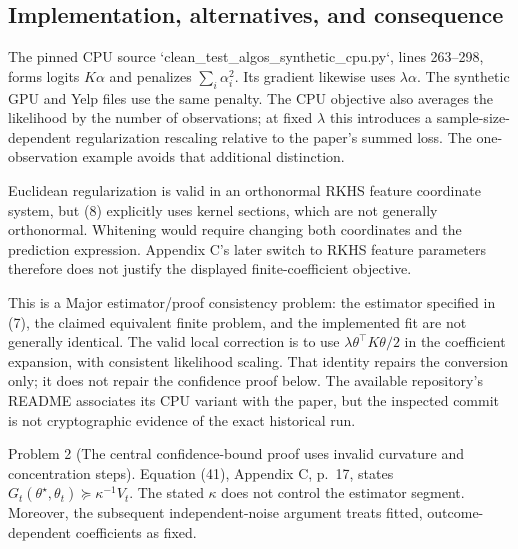 \documentclass[10pt]{article}
\begin{document}
\subsection*{Implementation, alternatives, and consequence}
The pinned CPU source `clean\_test\_algos\_synthetic\_cpu.py`, lines 263–298, forms logits \(K\alpha\) and penalizes \(\sum_i\alpha_i^2\). Its gradient likewise uses \(\lambda\alpha\). The synthetic GPU and Yelp files use the same penalty. The CPU objective also averages the likelihood by the number of observations; at fixed \(\lambda\) this introduces a sample-size-dependent regularization rescaling relative to the paper’s summed loss. The one-observation example avoids that additional distinction.\par
Euclidean regularization is valid in an orthonormal RKHS feature coordinate system, but (8) explicitly uses kernel sections, which are not generally orthonormal. Whitening would require changing both coordinates and the prediction expression. Appendix C’s later switch to RKHS feature parameters therefore does not justify the displayed finite-coefficient objective.\par
This is a Major estimator/proof consistency problem: the estimator specified in (7), the claimed equivalent finite problem, and the implemented fit are not generally identical. The valid local correction is to use \(\lambda\theta^\top K\theta/2\) in the coefficient expansion, with consistent likelihood scaling. That identity repairs the conversion only; it does not repair the confidence proof below. The available repository’s README associates its CPU variant with the paper, but the inspected commit is not cryptographic evidence of the exact historical run.\par
Problem 2 (The central confidence-bound proof uses invalid curvature and concentration steps).  Equation (41), Appendix C, p. 17, states \(G_t(\theta^\star,\theta_t)\succeq\kappa^{-1}V_t\). The stated \(\kappa\) does not control the estimator segment. Moreover, the subsequent independent-noise argument treats fitted, outcome-dependent coefficients as fixed.\par
\end{document}
